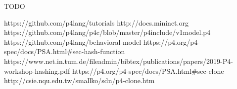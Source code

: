 \documentclass[sigconf,natbib=false]{acmart}
\begin{document}
TODO

\begin{thebibliography}{2}
 https://github.com/p4lang/tutorials
 http://docs.mininet.org
 https://github.com/p4lang/p4c/blob/master/p4include/v1model.p4
 https://github.com/p4lang/behavioral-model
 https://p4.org/p4-spec/docs/PSA.html\#sec-hash-function
 https://www.net.in.tum.de/fileadmin/bibtex/publications/papers/2019-P4-workshop-hashing.pdf
 https://p4.org/p4-spec/docs/PSA.html\#sec-clone
 http://csie.nqu.edu.tw/smallko/sdn/p4-clone.htm

\end{thebibliography}


\end{document}
